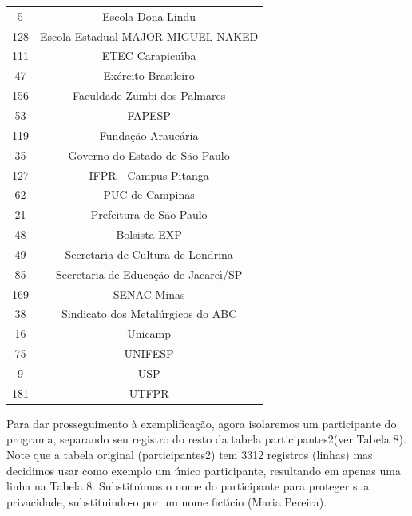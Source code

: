 \documentclass[
12pt,		%
openright,	%
twoside,  %
a4paper,			%
chapter=TITLE,		%
english,			%
french,				%
spanish,			%
brazil				%
]{USPSC-classe/USPSC}
\begin{document}
\begin{table}[htb]
\begin{tabular}{|c|c|}
                    5  &  Escola Dona Lindu \\
                  128  &  Escola Estadual MAJOR MIGUEL NAKED \\
                  111  &  ETEC Carapicu\'{\i}ba \\
                   47  &  Ex\'ercito Brasileiro \\
                  156  &  Faculdade Zumbi dos Palmares \\
                   53  &  FAPESP \\
                  119  &  Funda\c{c}\~ao Arauc\'aria \\
                   35  &  Governo do Estado de S\~ao Paulo \\
                  127  &  IFPR - Campus Pitanga \\
                   62  &  PUC de Campinas \\
                   21  &  Prefeitura de S\~ao Paulo           \\
                   48  &  Bolsista EXP \\
                   49  &  Secretaria de Cultura de Londrina \\
                   85  &  Secretaria de Educa\c{c}\~ao de Jacare\'{\i}/SP \\
                  169  &  SENAC Minas  \\
                   38  &  Sindicato dos Metal\'urgicos do ABC \\
                   16  &  Unicamp \\
                   75  &  UNIFESP  \\
                    9  &  USP \\
                  181  &  UTFPR \\
\hline
\end{tabular}
\end{table}


Para dar prosseguimento \`a exemplifica\c{c}\~ao, agora isolaremos um participante do programa, separando seu registro do resto da tabela \textquotedbl participantes2\textquotedbl  (ver Tabela 8). Note que a tabela original (participantes2)  tem 3312 registros (linhas) mas decidimos usar como exemplo um \'unico participante, resultando em apenas uma linha na Tabela 8. Substitu\'{\i}mos o nome do participante para proteger sua privacidade, substituindo-o por um nome fict\'{\i}cio (\textquotedbl Maria Pereira\textquotedbl ).
\end{document}
